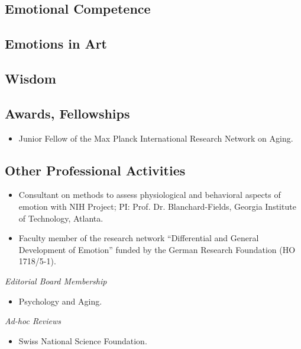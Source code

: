 \subsection{Emotional Competence}



\subsection{Emotions in Art}



\subsection{Wisdom}



\subsection{Awards, Fellowships}
\begin{itemize}
\item Junior Fellow of the Max Planck International Research Network on Aging. 
\end{itemize}

\subsection{Other Professional Activities}  

\begin{itemize}
\item Consultant on methods to assess physiological and behavioral aspects of emotion with NIH Project; PI: Prof. Dr. Blanchard-Fields, Georgia Institute of Technology, Atlanta.
\item Faculty member of the research network ``Differential and General Development of Emotion'' funded by the German Research Foundation (HO 1718/5-1).
\end{itemize}

\textit{Editorial Board Membership}

\begin{itemize}
\item Psychology and Aging.
\end{itemize}

\vspace{0.5ex}
\textit{Ad-hoc Reviews}

\begin{itemize}
\item Swiss National Science Foundation.
\end{itemize} 

